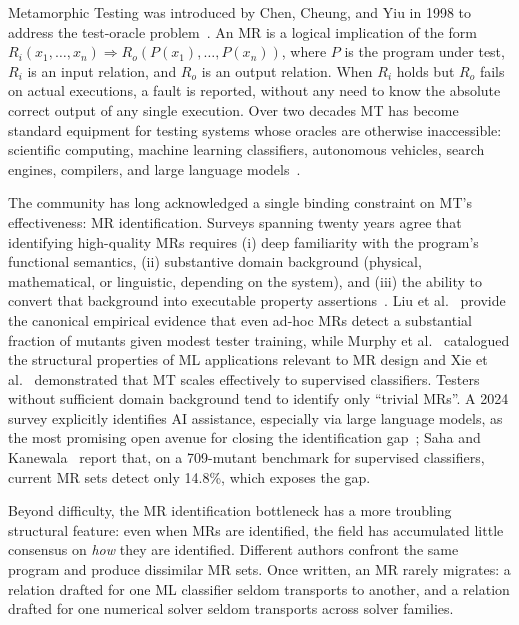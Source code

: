 \documentclass[acmsmall, screen]{acmart}
\begin{document}
Metamorphic Testing was introduced by Chen, Cheung, and Yiu in 1998 to address the test-oracle problem~\cite{Chen1998}. An MR is a logical implication of the form $R_i(x_1,\dots,x_n) \Rightarrow R_o(P(x_1),\dots,P(x_n))$, where $P$ is the program under test, $R_i$ is an input relation, and $R_o$ is an output relation. When $R_i$ holds but $R_o$ fails on actual executions, a fault is reported, without any need to know the absolute correct output of any single execution. Over two decades MT has become standard equipment for testing systems whose oracles are otherwise inaccessible: scientific computing, machine learning classifiers, autonomous vehicles, search engines, compilers, and large language models~\cite{Segura2016, LiTOSEM2025}.

The community has long acknowledged a single binding constraint on MT's effectiveness: MR identification. Surveys spanning twenty years agree that identifying high-quality MRs requires (i) deep familiarity with the program's functional semantics, (ii) substantive domain background (physical, mathematical, or linguistic, depending on the system), and (iii) the ability to convert that background into executable property assertions~\cite{Segura2016, LiTOSEM2025}. Liu et al.~\cite{Liu2014MTEffectiveness} provide the canonical empirical evidence that even ad-hoc MRs detect a substantial fraction of mutants given modest tester training, while Murphy et al.~\cite{Murphy2008} catalogued the structural properties of ML applications relevant to MR design and Xie et al.~\cite{Xie2011} demonstrated that MT scales effectively to supervised classifiers. Testers without sufficient domain background tend to identify only ``trivial MRs''. A 2024 survey explicitly identifies AI assistance, especially via large language models, as the most promising open avenue for closing the identification gap~\cite{LiTOSEM2025}; Saha and Kanewala~\cite{Saha2019SupervisedMR} report that, on a 709-mutant benchmark for supervised classifiers, current MR sets detect only 14.8\%, which exposes the gap.

Beyond difficulty, the MR identification bottleneck has a more troubling structural feature: even when MRs are identified, the field has accumulated little consensus on \emph{how} they are identified. Different authors confront the same program and produce dissimilar MR sets. Once written, an MR rarely migrates: a relation drafted for one ML classifier seldom transports to another, and a relation drafted for one numerical solver seldom transports across solver families.
\end{document}
